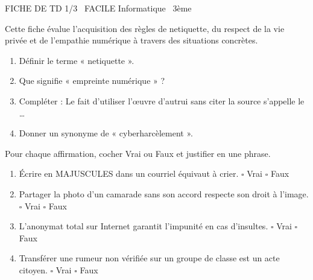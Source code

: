 \documentclass[11pt]{article}
\begin{document}
\begin{tcolorbox}[enhanced,colback=popink,colframe=popink,arc=10pt,boxrule=0pt,left=12pt,right=12pt,top=9pt,bottom=9pt]
{\color{white}\popxbold\small FICHE DE TD 1/3 \textbullet\ FACILE \hfill Informatique \textbullet\ 3ème\par}
\end{tcolorbox}
\vspace{4pt}
Cette fiche évalue l'acquisition des règles de netiquette, du respect de la vie privée et de l'empathie numérique à travers des situations concrètes.

\begin{exercice}
\begin{enumerate}
    \item Définir le terme « netiquette ».
    \item Que signifie « empreinte numérique » ?
    \item Compléter : Le fait d'utiliser l'œuvre d'autrui sans citer la source s'appelle le \ldots
    \item Donner un synonyme de « cyberharcèlement ».
\end{enumerate}
\end{exercice}

\begin{exercice}
Pour chaque affirmation, cocher Vrai ou Faux et justifier en une phrase.
\begin{enumerate}
    \item Écrire en MAJUSCULES dans un courriel équivaut à crier. \hfill $\square$ Vrai $\square$ Faux
    \item Partager la photo d'un camarade sans son accord respecte son droit à l'image. \hfill $\square$ Vrai $\square$ Faux
    \item L'anonymat total sur Internet garantit l'impunité en cas d'insultes. \hfill $\square$ Vrai $\square$ Faux
    \item Transférer une rumeur non vérifiée sur un groupe de classe est un acte citoyen. \hfill $\square$ Vrai $\square$ Faux
\end{enumerate}
\end{exercice}
\end{document}
